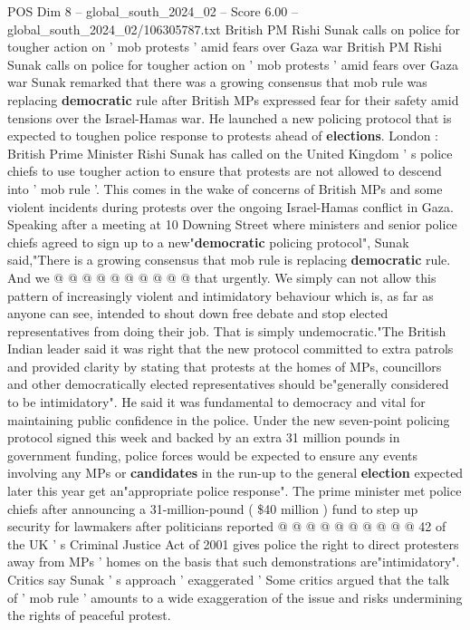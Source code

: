 \begin{textsample}{POS Dim 8 – global\_south\_2024\_02 – Score 6.00 – global\_south\_2024\_02/106305787.txt}  \label{ex:f8_pos_203}
British PM Rishi Sunak calls on police for tougher action on ' mob protests ' amid fears over Gaza war British PM Rishi Sunak calls on police for tougher action on ' mob protests ' amid fears over Gaza war Sunak remarked that there was a growing consensus that mob rule was replacing \textbf{democratic} rule after British MPs expressed fear for their safety amid tensions over the Israel-Hamas war.
He launched a new policing protocol that is expected to toughen police response to protests ahead of \textbf{elections}.
London : British Prime Minister Rishi Sunak has called on the United Kingdom ' s police chiefs to use tougher action to ensure that protests are not allowed to descend into ' mob rule '.
This comes in the wake of concerns of British MPs and some violent incidents during protests over the ongoing Israel-Hamas conflict in Gaza.
Speaking after a meeting at 10 Downing Street where ministers and senior police chiefs agreed to sign up to a new"\textbf{democratic} policing protocol", Sunak said,"There is a growing consensus that mob rule is replacing \textbf{democratic} rule.
And we @ @ @ @ @ @ @ @ @ @ that urgently.
We simply can not allow this pattern of increasingly violent and intimidatory behaviour which is, as far as anyone can see, intended to shout down free debate and stop elected representatives from doing their job.
That is simply undemocratic."The British Indian leader said it was right that the new protocol committed to extra patrols and provided clarity by stating that protests at the homes of MPs, councillors and other democratically elected representatives should be"generally considered to be intimidatory".
He said it was fundamental to democracy and vital for maintaining public confidence in the police.
Under the new seven-point policing protocol signed this week and backed by an extra 31 million pounds in government funding, police forces would be expected to ensure any events involving any MPs or \textbf{candidates} in the run-up to the general \textbf{election} expected later this year get an"appropriate police response".
The prime minister met police chiefs after announcing a 31-million-pound ( \$40 million ) fund to step up security for lawmakers after politicians reported @ @ @ @ @ @ @ @ @ @ 42 of the UK ' s Criminal Justice Act of 2001 gives police the right to direct protesters away from MPs ' homes on the basis that such demonstrations are"intimidatory".
Critics say Sunak ' s approach ' exaggerated ' Some critics argued that the talk of ' mob rule ' amounts to a wide exaggeration of the issue and risks undermining the rights of peaceful protest.

\end{textsample}
